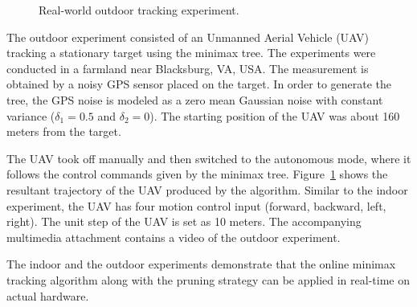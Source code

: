 \documentclass[journal]{IEEEtran}
\begin{document}
\begin{figure}
\caption{Real-world outdoor tracking experiment.}
\label{fig:outdoorexpts}         
\end{figure}

The outdoor experiment consisted of an Unmanned Aerial Vehicle (UAV) tracking a stationary target using the minimax tree. The experiments were conducted in a farmland near Blacksburg, VA, USA. The measurement is obtained by a noisy GPS sensor placed on the target. In order to generate the tree, the GPS noise is modeled as a zero mean Gaussian noise with constant variance ($\delta_1 = 0.5$ and $\delta_2 = 0$). The starting position of the UAV was about 160 meters from the target.

The UAV took off manually and then switched to the autonomous mode, where it follows the control commands given by the minimax tree. Figure~\ref{fig:outdoorexpts} shows the resultant trajectory of the UAV produced by the algorithm. Similar to the indoor experiment, the UAV has four motion control input (forward, backward, left, right). The unit step of the UAV is set as 10 meters. The accompanying multimedia attachment contains a video of the outdoor experiment.

The indoor and the outdoor experiments demonstrate that the online minimax tracking algorithm along with the pruning strategy can be applied in real-time on actual hardware.
\end{document}
